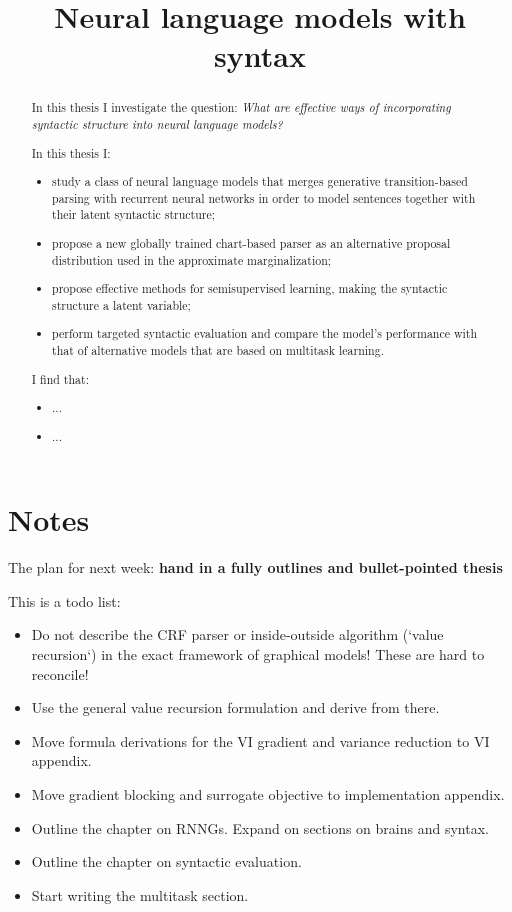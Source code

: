 \documentclass[examplefnt,biber]{../src/nowfnt} %
\title{Neural language models with syntax}
\begin{document}
\makeabstracttitle

\begin{abstract}
In this thesis I investigate the question: \textit{What are effective ways of incorporating syntactic structure into neural language models?}

In this thesis I:
\begin{itemize}
  \item study a class of neural language models that merges generative transition-based parsing with recurrent neural networks in order to model sentences together with their latent syntactic structure;
  \item propose a new globally trained chart-based parser as an alternative proposal distribution used in the approximate marginalization;
  \item propose effective methods for semisupervised learning, making the syntactic structure a latent variable;
  \item perform targeted syntactic evaluation and compare the model's performance with that of alternative models that are based on multitask learning.
\end{itemize}
I find that:
\begin{itemize}
  \item ...
  \item ...
\end{itemize}
\end{abstract}

\chapter{Notes}
The plan for next week: \textbf{hand in a fully outlines and bullet-pointed thesis}

This is a todo list:
\begin{itemize}
  \item Do not describe the CRF parser or inside-outside algorithm (`value recursion`) in the exact framework of graphical models! These are hard to reconcile!
  \item Use the general value recursion formulation and derive from there.
  \item Move formula derivations for the VI gradient and variance reduction to VI appendix.
  \item Move gradient blocking and surrogate objective to implementation appendix.
  \item Outline the chapter on RNNGs. Expand on sections on brains and syntax.
  \item Outline the chapter on syntactic evaluation.
  \item Start writing the multitask section.
\end{itemize}
\end{document}
